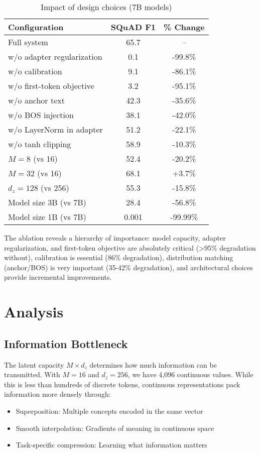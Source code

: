 \documentclass{article}
\begin{document}
\begin{table}[h]
\caption{Impact of design choices (7B models)}
\label{tab:ablation_extended}
\vskip 0.15in
\begin{center}
\begin{small}
\begin{tabular}{lcc}
\toprule
Configuration & SQuAD F1 & \% Change \\
\midrule
Full system & 65.7 & -- \\
\midrule
w/o adapter regularization & 0.1 & -99.8\% \\
w/o calibration & 9.1 & -86.1\% \\
w/o first-token objective & 3.2 & -95.1\% \\
w/o anchor text & 42.3 & -35.6\% \\
w/o BOS injection & 38.1 & -42.0\% \\
w/o LayerNorm in adapter & 51.2 & -22.1\% \\
w/o tanh clipping & 58.9 & -10.3\% \\
$M=8$ (vs 16) & 52.4 & -20.2\% \\
$M=32$ (vs 16) & 68.1 & +3.7\% \\
$d_z=128$ (vs 256) & 55.3 & -15.8\% \\
Model size 3B (vs 7B) & 28.4 & -56.8\% \\
Model size 1B (vs 7B) & 0.001 & -99.99\% \\
\bottomrule
\end{tabular}
\end{small}
\end{center}
\vskip -0.1in
\end{table}

The ablation reveals a hierarchy of importance: model capacity, adapter regularization, and first-token objective are absolutely critical (>95\% degradation without), calibration is essential (86\% degradation), distribution matching (anchor/BOS) is very important (35-42\% degradation), and architectural choices provide incremental improvements.

\section{Analysis}

\subsection{Information Bottleneck}

The latent capacity $M \times d_z$ determines how much information can be transmitted. With $M=16$ and $d_z=256$, we have 4,096 continuous values. While this is less than hundreds of discrete tokens, continuous representations pack information more densely through:
\begin{itemize}
\item Superposition: Multiple concepts encoded in the same vector
\item Smooth interpolation: Gradients of meaning in continuous space
\item Task-specific compression: Learning what information matters
\end{itemize}
\end{document}
